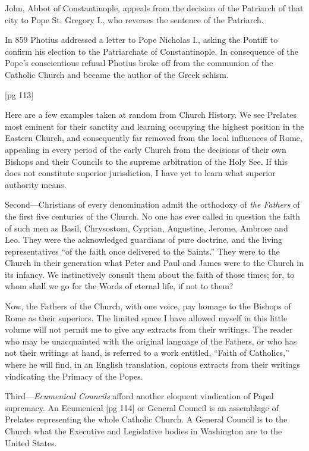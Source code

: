 John, Abbot of Constantinople, appeals from
the decision of the Patriarch of that city to Pope
St. Gregory I., who reverses the sentence of the
Patriarch.

In 859 Photius addressed a letter to Pope
Nicholas I., asking the Pontiff to confirm his election
to the Patriarchate of Constantinople. In
consequence of the Pope's conscientious refusal
Photius broke off from the communion of the
Catholic Church and became the author of the
Greek schism.

[pg 113]

Here are a few examples taken at random from
Church History. We see Prelates most eminent
for their sanctity and learning occupying the highest
position in the Eastern Church, and consequently
far removed from the local influences of
Rome, appealing in every period of the early
Church from the decisions of their own Bishops
and their Councils to the supreme arbitration of
the Holy See. If this does not constitute superior
jurisdiction, I have yet to learn what superior authority
means.

Second—Christians of every denomination admit
the orthodoxy of \emph{the Fathers} of the first five
centuries of the Church. No one has ever called
in question the faith of such men as Basil, Chrysostom,
Cyprian, Augustine, Jerome, Ambrose and
Leo. They were the acknowledged guardians of
pure doctrine, and the living representatives “of
the faith once delivered to the Saints.” They were
to the Church in their generation what Peter and
Paul and James were to the Church in its infancy.
We instinctively consult them about the faith of
those times; for, to whom shall we go for the
Words of eternal life, if not to them?

Now, the Fathers of the Church, with one voice,
pay homage to the Bishops of Rome as their superiors.
The limited space I have allowed myself
in this little volume will not permit me to give
any extracts from their writings. The reader who
may be unacquainted with the original language
of the Fathers, or who has not their writings at
hand, is referred to a work entitled, “Faith of
Catholics,” where he will find, in an English translation,
copious extracts from their writings vindicating
the Primacy of the Popes.

Third—\emph{Ecumenical Councils} afford another eloquent
vindication of Papal supremacy. An Ecumenical
[pg 114]
or General Council is an assemblage of
Prelates representing the whole Catholic Church.
A General Council is to the Church what the Executive
and Legislative bodies in Washington are
to the United States.

